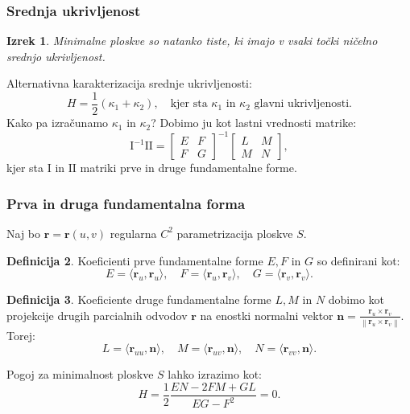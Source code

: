 \documentclass[10pt]{beamer}
\theoremstyle{definition}
\newtheorem{definicija}{Definicija}
\theoremstyle{remark}
\theoremstyle{plain}
\newtheorem{izrek}[definicija]{Izrek}
\numberwithin{equation}{section}  %
\begin{document}
\begin{frame}
    \frametitle{Srednja ukrivljenost}

    \begin{izrek}
        Minimalne ploskve so natanko tiste, ki imajo v vsaki točki ničelno srednjo ukrivljenost. 
    \end{izrek}

    Alternativna karakterizacija srednje ukrivljenosti:
    $$
    H=\frac{1}{2}\left(\kappa_1+\kappa_2\right), \quad \text{kjer sta } \kappa_1 \text{ in } \kappa_2 \text{ glavni ukrivljenosti.} 
    $$
    Kako pa izračunamo $\kappa_1$ in $\kappa_2$? Dobimo ju kot lastni vrednosti matrike: 
    $$
    \mathrm{I}^{-1} \mathrm{II}=\begin{bmatrix} E & F \\ F & G \end{bmatrix}^{-1} \begin{bmatrix} L & M \\ M & N \end{bmatrix},
    $$
    kjer sta $\mathrm{I}$ in $\mathrm{II}$ matriki prve in druge fundamentalne forme.

\end{frame}

\begin{frame}
    \frametitle{Prva in druga fundamentalna forma}

    Naj bo $\mathbf{r}=\mathbf{r}(u, v)$ regularna $C^2$ parametrizacija ploskve $S$. 

    \begin{definicija}
        Koeficienti prve fundamentalne forme $E, F$ in $G$ so definirani kot: 
        $$
        E=\langle\mathbf{r}_u, \mathbf{r}_u\rangle, \quad F=\langle\mathbf{r}_u, \mathbf{r}_v\rangle, \quad G=\langle\mathbf{r}_v, \mathbf{r}_v\rangle.
        $$
    \end{definicija}

    \begin{definicija}
        Koeficiente druge fundamentalne forme $L, M$ in $N$ dobimo kot projekcije drugih parcialnih odvodov $\mathbf{r}$ na enostki normalni vektor $\mathbf{n}=\frac{\mathbf{r}_u \times \mathbf{r}_v}{\left\|\mathbf{r}_u \times \mathbf{r}_v\right\|}$. Torej: 
        $$
        L=\langle \mathbf{r}_{u u}, \mathbf{n} \rangle, \quad M=\langle \mathbf{r}_{u v}, \mathbf{n}\rangle, \quad N= \langle \mathbf{r}_{v v}, \mathbf{n} \rangle.
        $$
    \end{definicija}

    Pogoj za minimalnost ploskve $S$ lahko izrazimo kot: 
    $$
    H=\frac{1}{2} \frac{E N-2 F M+G L}{E G-F^2} = 0.
    $$

\end{frame}
\end{document}
